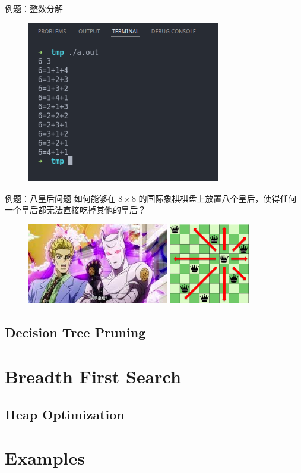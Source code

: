 \documentclass[12pt,aspectratio=169]{beamer}
\begin{document}
\begin{frame}[fragile]{例题：整数分解}
  \begin{figure}
    \includegraphics[height=200pt]{example1.png}
  \end{figure}
\end{frame}

\begin{frame}[fragile]{例题：八皇后问题}
  如何能够在 $8 \times 8$ 的国际象棋棋盘上放置八个皇后，使得任何一个皇后都无法直接吃掉其他的皇后？

  \begin{figure}
    \includegraphics[height=100pt]{killer_queen.jpeg}
    \includegraphics[height=100pt]{queen.png}
  \end{figure}
\end{frame}

\subsection[剪枝优化]{Decision Tree Pruning}

\section[广度优先搜索]{Breadth First Search}
\subsection[堆优化]{Heap Optimization}

\section[例题]{Examples}
\end{document}
